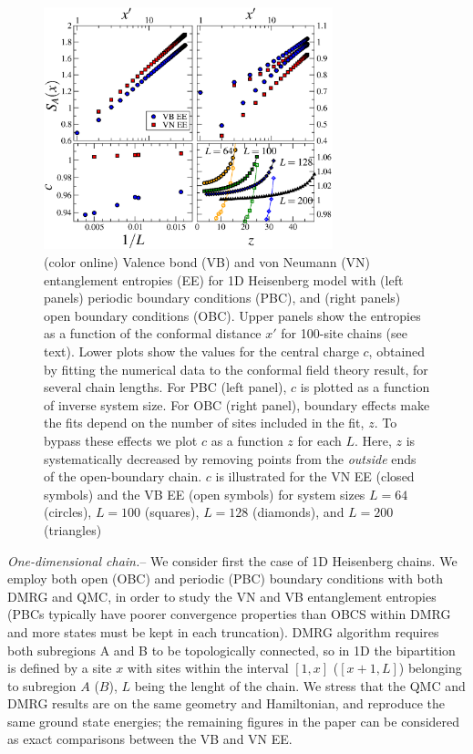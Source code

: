 \documentclass[prl,aps,twocolumn,floatfix,amsmath,amssymb,superscriptaddress,tightenlines]{revtex4}
\begin{document}
\begin{figure} {
\includegraphics[width=3.3in]{4-panelFIG1.eps} \caption{(color online)
Valence bond (VB) and von Neumann (VN) entanglement entropies (EE) for 1D
Heisenberg model with (left panels) periodic boundary conditions (PBC),
and (right panels) open boundary conditions (OBC). Upper panels show the
entropies as a function of the conformal distance $x'$ for 100-site chains
(see text). Lower plots show the values for the central charge $c$,
obtained by fitting the numerical data to the conformal field theory
result, for several chain lengths. For PBC (left panel), $c$ is plotted as
a function of inverse system size. For OBC (right panel), boundary effects
make the fits depend on the number of sites included in the fit, $z$. To
bypass these effects we plot $c$ as a function $z$ for each $L$. Here, $z$
is systematically decreased by removing points from the {\it outside} ends
of the open-boundary chain. $c$ is illustrated for the VN EE (closed
symbols) and the VB EE (open symbols) for system sizes $L=64$ (circles),
$L=100$ (squares), $L=128$ (diamonds), and $L=200$ (triangles)
\label{1D}}} \end{figure}

{\it One-dimensional chain.}-- We consider first the case of 1D Heisenberg
chains. We employ both open (OBC) and periodic (PBC) boundary conditions
with both DMRG and QMC, in order to study the VN and VB entanglement
entropies (PBCs typically have poorer convergence properties than OBCS
within DMRG and more states must be kept in each truncation). 
DMRG algorithm requires both subregions A and B to be topologically
connected, so in 1D the bipartition is defined by a site $x$ with sites
within the interval $[1,x]$ ($[x+1,L]$) belonging to subregion $A$ ($B$),
$L$ being the lenght of the chain. We stress that the QMC and DMRG results
are on the same geometry and Hamiltonian, and reproduce the same ground
state energies; the remaining figures in the paper can be considered as
exact comparisons between the VB and VN EE. 
\end{document}
